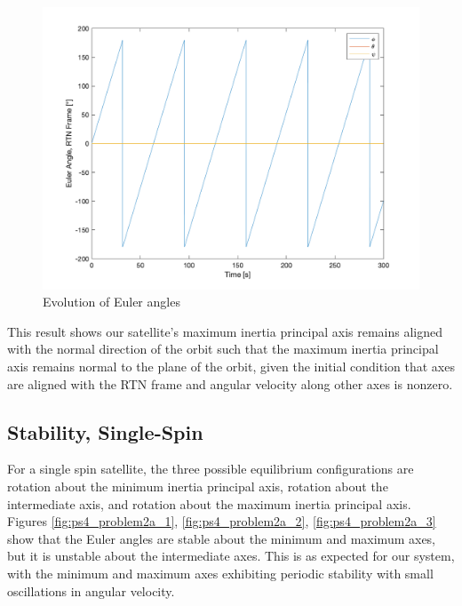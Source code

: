 \begin{figure}[H]
\centering
\includegraphics[scale=0.6]{Images/ps4_problem1b_euler.png}
\caption{Evolution of Euler angles}
\label{fig:ps4_problem1b_euler}
\end{figure}

This result shows our satellite's maximum inertia principal axis remains aligned with the normal direction of the orbit such that the maximum inertia principal axis remains normal to the plane of the orbit, given the initial condition that axes are aligned with the RTN frame and angular velocity along other axes is nonzero.

\subsection{Stability, Single-Spin}
For a single spin satellite, the three possible equilibrium configurations are rotation about the minimum inertia principal axis, rotation about the intermediate axis, and rotation about the maximum inertia principal axis. Figures \ref{fig:ps4_problem2a_1}, \ref{fig:ps4_problem2a_2}, \ref{fig:ps4_problem2a_3} show that the Euler angles are stable about the minimum and maximum axes, but it is unstable about the intermediate axes. This is as expected for our system, with the minimum and maximum axes exhibiting periodic stability with small oscillations in angular velocity.

